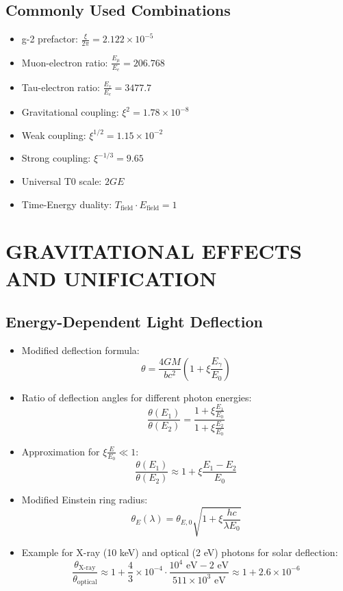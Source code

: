 \documentclass[12pt,a4paper]{article}
\begin{document}
	\subsection{Commonly Used Combinations}
	\begin{itemize}
		\item g-2 prefactor: $\frac{\xi}{2\pi} = 2.122 \times 10^{-5}$
		\item Muon-electron ratio: $\frac{E_\mu}{E_e} = 206.768$
		\item Tau-electron ratio: $\frac{E_\tau}{E_e} = 3477.7$
		\item Gravitational coupling: $\xi^2 = 1.78 \times 10^{-8}$
		\item Weak coupling: $\xi^{1/2} = 1.15 \times 10^{-2}$
		\item Strong coupling: $\xi^{-1/3} = 9.65$
		\item Universal T0 scale: $2GE$
		\item Time-Energy duality: $T_{\text{field}} \cdot E_{\text{field}} = 1$
	\end{itemize}
	
	\section{GRAVITATIONAL EFFECTS AND UNIFICATION}
	

	\subsection{Energy-Dependent Light Deflection}
	\begin{itemize}
		\item Modified deflection formula:
		$$\boxed{\theta = \frac{4GM}{bc^2}\left(1 + \xi \frac{E_\gamma}{E_0}\right)}$$
		
		\item Ratio of deflection angles for different photon energies:
		$$\frac{\theta(E_1)}{\theta(E_2)} = \frac{1 + \xi \frac{E_1}{E_0}}{1 + \xi \frac{E_2}{E_0}}$$
		
		\item Approximation for $\xi \frac{E}{E_0} \ll 1$:
		$$\frac{\theta(E_1)}{\theta(E_2)} \approx 1 + \xi \frac{E_1 - E_2}{E_0}$$
		
		\item Modified Einstein ring radius:
		$$\theta_E(\lambda) = \theta_{E,0} \sqrt{1 + \xi \frac{hc}{\lambda E_0}}$$
		
		\item Example for X-ray (10 keV) and optical (2 eV) photons for solar deflection:
		$$\frac{\theta_{\text{X-ray}}}{\theta_{\text{optical}}} \approx 1 + \frac{4}{3} \times 10^{-4} \cdot \frac{10^4 \text{ eV} - 2 \text{ eV}}{511 \times 10^3 \text{ eV}} \approx 1 + 2.6 \times 10^{-6}$$
	\end{itemize}
	
\end{document}

